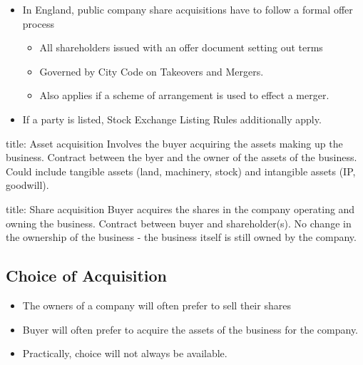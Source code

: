 \documentclass[
]{article}
\newenvironment{Shaded}{}{}
\newcommand{\NormalTok}[1]{#1}
\providecommand{\tightlist}{%
  \setlength{\itemsep}{0pt}\setlength{\parskip}{0pt}}
\begin{document}
\begin{itemize}
\tightlist
\item
  In England, public company share acquisitions have to follow a formal
  offer process

  \begin{itemize}
  \tightlist
  \item
    All shareholders issued with an offer document setting out terms
  \item
    Governed by City Code on Takeovers and Mergers.
  \item
    Also applies if a scheme of arrangement is used to effect a merger.
  \end{itemize}
\item
  If a party is listed, Stock Exchange Listing Rules additionally apply.
\end{itemize}

\begin{Shaded}
\begin{Highlighting}[]
\NormalTok{title: Asset acquisition}
\NormalTok{Involves the buyer acquiring the assets making up the business. Contract between the byer and the owner of the assets of the business. Could include tangible assets (land, machinery, stock) and intangible assets (IP, goodwill). }
\end{Highlighting}
\end{Shaded}

\begin{Shaded}
\begin{Highlighting}[]
\NormalTok{title: Share acquisition}
\NormalTok{Buyer acquires the shares in the company operating and owning the business. Contract between buyer and shareholder(s). No change in the ownership of the business {-} the business itself is still owned by the company. }
\end{Highlighting}
\end{Shaded}

\hypertarget{choice-of-acquisition}{%
\subsection{Choice of Acquisition}\label{choice-of-acquisition}}

\begin{itemize}
\tightlist
\item
  The owners of a company will often prefer to sell their shares
\item
  Buyer will often prefer to acquire the assets of the business for the
  company.
\item
  Practically, choice will not always be available.
\end{itemize}
\end{document}
